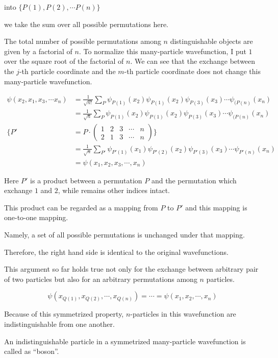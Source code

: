 into $\{P(1),P(2),\cdots P(n)\}$

we take the sum over all possible permutations here. 

The total number of possible permutations among $n$ distinguishable objects are given by a factorial of $n$. To normalize this many-particle wavefunction, I put $1$ over the square root of the factorial of $n$. We can see that the exchange between the $j$-th particle coordinate and the $m$-th particle coordinate does not change this many-particle wavefunction. 

\[\begin{split}
\psi(x_2,x_1,x_3,\cdots x_n) &= \frac{1}{\sqrt{n!}}\sum_P\psi_{P(1)}(x_2)\psi_{P(1)}(x_2)\psi_{P(3)}(x_3)\cdots\psi_{(P(n)}(x_n)\\
&=\frac{1}{\sqrt{n}}\sum_P\psi_{P(1)}(x_2)\psi_{P(1)}(x_2)\psi_{P(3)}(x_3)\cdots\psi_{(P(n)}(x_n)\\
\Big\{P' &= P\cdot\left(
\begin{matrix}
1 & 2 & 3 & \cdots & n\\
2 & 1 & 3 & \cdots & n
\end{matrix}\right)\Big\}\\
&=\frac{1}{\sqrt{n}}\sum_{P'}\psi_{P'(1)}(x_1)\psi_{P'(2)}(x_2)\psi_{P'(3)}(x_3)\cdots\psi_{P'(n)}(x_n)\\
&= \psi(x_1,x_2,x_3,\cdots, x_n)
\end{split}\]

Here $P'$ is a product between a permutation $P$ and the permutation which exchange $1$ and $2$, while remains other indices intact. 

This product can be regarded as a mapping from $P$ to $P'$ and this mapping is one-to-one mapping. 

Namely, a set of all possible permutations is unchanged under that mapping. 

Therefore, the right hand side is identical to the original wavefunctions. 

This argument so far holds true not only for the exchange between arbitrary pair of two particles but also for an arbitrary permutations among $n$ particles. 

\[\psi(x_{Q(1)},x_{Q(2)},\cdots,x_{Q(n)}) = \cdots=\psi(x_1,x_2,\cdots,x_n) \]

Because of this symmetrized property, $n$-particles in this wavefunction are indistinguishable from one another. 

An indistinguishable particle in a symmetrized many-particle wavefunction is called as ``boson''. 

